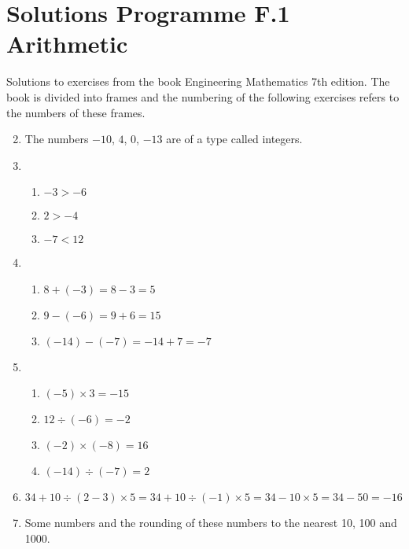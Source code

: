 \documentclass[fleqn]{article}
\begin{document}
\section*{Solutions Programme F.1 Arithmetic}
Solutions to exercises from the book Engineering Mathematics 7th edition. The book is divided into frames and the numbering of the following exercises refers to the numbers of these frames.

\begin{enumerate}[label=\textbf{\arabic*.},labelsep=2em]

\setcounter{enumi}{1}
\item
The numbers $-10$, $4$, $0$, $-13$ are of a type called integers.

\item

\begin{enumerate}[label=\textbf{(\alph*)},labelsep=2em]
\item $-3 > -6$
\item $2 > -4$
\item $-7 < 12$
\end{enumerate} 

\setcounter{enumi}{4}
\item

\begin{enumerate}[label=\textbf{(\alph*)}]
\item $8 + (-3) = 8 - 3 = 5$
\item $9 - (-6) = 9 + 6 = 15$
\item $(-14) - (-7) = -14 + 7 = -7$
\end{enumerate}

\setcounter{enumi}{6}
\item
\begin{enumerate}[label=\textbf{(\alph*)}]
\item $(-5) \times 3 = -15$
\item $12 \div (-6) = -2$
\item $(-2) \times (-8) = 16$
\item $(-14) \div (-7) = 2$
\end{enumerate}

\setcounter{enumi}{8} 
\item
$34 + 10 \div (2 - 3) \times 5 = 
34 + 10 \div (-1) \times 5 = 
34 -10 \times 5 = 
34 - 50 = -16$

\setcounter{enumi}{12}

\item Some numbers and the rounding of these numbers to the nearest 10, 100 and 1000. 


\end{enumerate}
\end{document}
